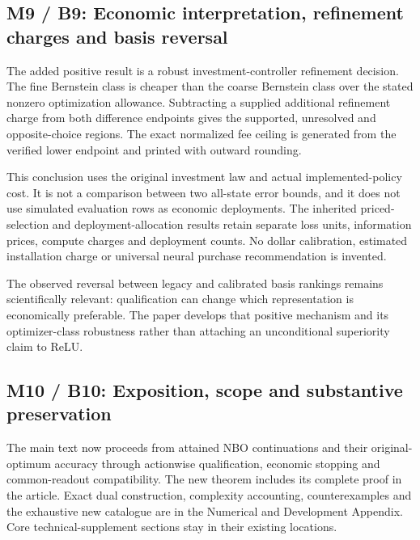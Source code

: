 \hypertarget{m9-b9-economic-interpretation-refinement-charges-and-basis-reversal}{%
\subsection{M9 / B9: Economic interpretation, refinement charges and
basis
reversal}\label{m9-b9-economic-interpretation-refinement-charges-and-basis-reversal}}

The added positive result is a robust investment-controller refinement
decision. The fine Bernstein class is cheaper than the coarse Bernstein
class over the stated nonzero optimization allowance. Subtracting a
supplied additional refinement charge from both difference endpoints
gives the supported, unresolved and opposite-choice regions. The exact
normalized fee ceiling is generated from the verified lower endpoint and
printed with outward rounding.

This conclusion uses the original investment law and actual
implemented-policy cost. It is not a comparison between two all-state
error bounds, and it does not use simulated evaluation rows as economic
deployments. The inherited priced-selection and deployment-allocation
results retain separate loss units, information prices, compute charges
and deployment counts. No dollar calibration, estimated installation
charge or universal neural purchase recommendation is invented.

The observed reversal between legacy and calibrated basis rankings
remains scientifically relevant: qualification can change which
representation is economically preferable. The paper develops that
positive mechanism and its optimizer-class robustness rather than
attaching an unconditional superiority claim to ReLU.

\hypertarget{m10-b10-exposition-scope-and-substantive-preservation}{%
\subsection{M10 / B10: Exposition, scope and substantive
preservation}\label{m10-b10-exposition-scope-and-substantive-preservation}}

The main text now proceeds from attained NBO continuations and their
original-optimum accuracy through actionwise qualification, economic
stopping and common-readout compatibility. The new theorem includes its
complete proof in the article. Exact dual construction, complexity
accounting, counterexamples and the exhaustive new catalogue are in the
Numerical and Development Appendix. Core technical-supplement sections
stay in their existing locations.

